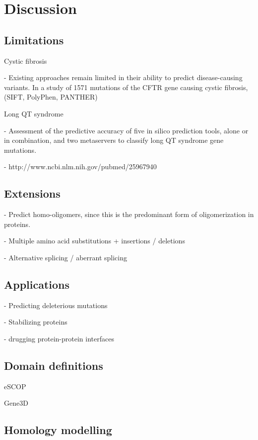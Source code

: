 \chapter{Discussion}

\section{Limitations}

Cystic fibrosis

  - Existing approaches remain limited in their ability to predict disease-causing variants. In a study of 1571 mutations of the CFTR gene causing cystic fibrosis, (SIFT, PolyPhen, PANTHER) \cite{dorfman_common_2010-1}


Long QT syndrome

  - Assessment of the predictive accuracy of five in silico prediction tools, alone or in combination, and two metaservers to classify long QT syndrome gene mutations.

  - http://www.ncbi.nlm.nih.gov/pubmed/25967940
  
  

\section{Extensions}

- Predict homo-oligomers, since this is the predominant form of oligomerization in proteins.

- Multiple amino acid substitutions + insertions / deletions

- Alternative splicing / aberrant splicing



\section{Applications}

 - Predicting deleterious mutations
 
 - Stabilizing proteins
 
 - drugging protein-protein interfaces \cite{wells_reaching_2007}
 

\section{Domain definitions}

eSCOP

Gene3D

\section{Homology modelling}

